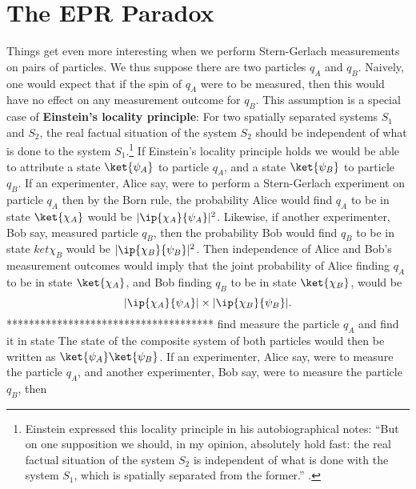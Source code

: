 \section{The EPR Paradox}
Things get even more interesting when we perform Stern-Gerlach measurements on pairs of particles. We thus suppose there are two particles $q_A$ and $q_B$. Naively, one would expect that if the spin of $q_A$ were to be measured, then this would have no effect on any measurement outcome for $q_B$. This assumption is a special case of \textbf{Einstein's locality principle}: For two spatially separated systems $S_1$ and $S_2$,  the real factual situation of the system $S_2$ should be independent of what is done to the system $S_1$.\footnote{Einstein expressed this locality principle in his autobiographical notes: ``But on one supposition we should, in my opinion, absolutely hold fast: the real factual situation of the system $S_2$ is independent of what is done with the system $S_1$, which is spatially separated from the former.'' \cite[p. 85]{EinsteinLocality}.} If Einstein's locality principle holds we would be able to attribute a state $\ket{\psi_A}$ to particle $q_A$, and a state $\ket{\psi_B}$ to particle $q_B$. If an experimenter, Alice say, were to perform a Stern-Gerlach experiment on particle $q_A$ then by the Born rule, the probability Alice would find $q_A$ to be in state $\ket{\chi_A}$ would be $|\ip{\chi_A}{\psi_A}|^2$. Likewise, if another  experimenter, Bob say, measured particle $q_B$, then the probability Bob would find $q_B$ to be in state $
ket{\chi_B}$ would be $|\ip{\chi_B}{\psi_B}|^2$. Then independence of Alice and Bob's measurement outcomes would imply that the joint probability of Alice finding $q_A$ to be in state $
\ket{\chi_A}$, and Bob finding $q_B$ to be in state $\ket{\chi_B}$, would be $$|\ip{\chi_A}{\psi_A}|\times|\ip{\chi_B}{\psi_B}|.$$************************************* find measure the particle $q_A$ and find it in state
 The state of the composite system of both particles would then be written as $\ket{\psi_A}\ket{\psi_B}$. If an experimenter, Alice say, were to measure the particle $q_A$, and another experimenter, Bob say, were to measure the particle $q_B$, then